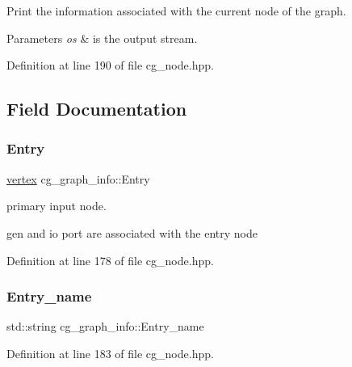 Print the information associated with the current node of the graph. 


\begin{DoxyParams}{Parameters}
{\em os} & is the output stream. \\
\hline
\end{DoxyParams}


Definition at line 190 of file cg\+\_\+node.\+hpp.



\subsection{Field Documentation}
\mbox{\label{structcg__graph__info_aa2b4b9714cfa4b6d617e9bd4c9da0944}} 
\subsubsection{\texorpdfstring{Entry}{Entry}}
{\footnotesize\ttfamily \hyperlink{graph_8hpp_abefdcf0544e601805af44eca032cca14}{vertex} cg\+\_\+graph\+\_\+info\+::\+Entry}



primary input node. 

gen and io port are associated with the entry node 

Definition at line 178 of file cg\+\_\+node.\+hpp.

\mbox{\label{structcg__graph__info_a4d6f2711d19ec9313aeb863ba33e8a33}} 
\subsubsection{\texorpdfstring{Entry\+\_\+name}{Entry\_name}}
{\footnotesize\ttfamily std\+::string cg\+\_\+graph\+\_\+info\+::\+Entry\+\_\+name}



Definition at line 183 of file cg\+\_\+node.\+hpp.

\mbox{\label{structcg__graph__info_ae324aa2b2134a3de14030533dc05750f}} 
